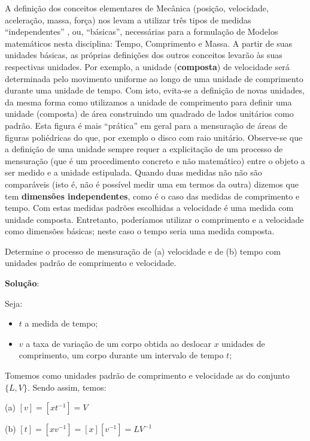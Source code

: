     A definição dos conceitos elementares de Mecânica (posição, velocidade, aceleração, massa, força) nos levam a utilizar três tipos de medidas ``independentes'' , ou, ``básicas'', necessárias para a formulação de Modelos matemáticos nesta disciplina: Tempo, Comprimento e Massa. A partir de suas unidades básicas, as próprias definições dos outros conceitos levarão às suas respectivas unidades. Por exemplo, a unidade (\textbf{composta}) de velocidade será determinada pelo movimento uniforme ao longo de uma unidade de comprimento durante uma unidade de tempo. Com isto, evita-se a definição de novas unidades, da mesma forma como utilizamos a unidade de comprimento para definir uma unidade (composta) de área construindo um quadrado de lados unitários como padrão. Esta figura é mais ``prática'' em geral para a mensuração de áreas de figuras poliédricas do que, por exemplo o disco com raio unitário. Observe-se que a definição de uma unidade sempre requer a explicitação de um processo de mensuração (que é um procedimento concreto e não matemático) entre o objeto a ser medido e a unidade estipulada. Quando duas medidas não não são comparáveis (isto é, não é possível medir uma em termos da outra) dizemos que tem \textbf{dimensões independentes}, como é o caso das medidas de comprimento e tempo. Com estas medidas padrões escolhidas a velocidade é uma medida com unidade composta. Entretanto, poderíamos utilizar o comprimento e a velocidade como dimensões básicas; neste caso o tempo seria uma medida composta.

    \begin{exercise}
    Determine o processo de mensuração de (a) velocidade e de (b) tempo com unidades padrão de comprimento e velocidade.
    \end{exercise}
    
    \textbf{Solução}:
    {\color{orange}
    Seja:
    \begin{itemize}
    \item \(t\) a medida de tempo;
    \item \(v\) a taxa de variação de um corpo obtida ao deslocar \(x\) unidades de comprimento, um corpo durante um intervalo de tempo \(t\);
    \end{itemize}

    Tomemos como unidades padrão de comprimento e velocidade as do conjunto \(\{L, V\}\). Sendo assim, temos:
    
    \begin{description}
    \item (a) \([v] = [x t^{-1}] = V\) 
    \item (b) \([t] = [x v^{-1}] = [x] [v^{-1}] = L V^{-1}\)
    \end{description}
    }

